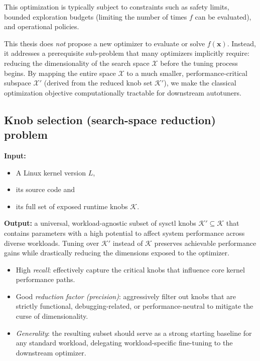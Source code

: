 This optimization is typically subject to constraints such as safety limits, bounded exploration budgets (limiting the number of times $f$ can be evaluated), and operational policies.

This thesis does \emph{not} propose a new optimizer to evaluate or solve $f(\mathbf{x})$.
Instead, it addresses a prerequisite sub-problem that many optimizers implicitly require: reducing the dimensionality of the search space $\mathcal{X}$ before the tuning process begins. By mapping the entire space $\mathcal{X}$ to a much smaller, performance-critical subspace $\mathcal{X}'$ (derived from the reduced knob set $\mathcal{K}'$), we make the classical optimization objective computationally tractable for downstream autotuners.

\subsection{Knob selection (search-space reduction) problem}\label{sec:problem-knob-selection}

\textbf{Input:}
\begin{itemize}
    \item A Linux kernel version $L$,
    \item its source code and
    \item its full set of exposed runtime knobs $\mathcal{K}$.
\end{itemize}

\textbf{Output:} a universal, workload-agnostic subset of sysctl knobs $\mathcal{K}' \subseteq \mathcal{K}$ that contains parameters with a high potential to affect system performance across diverse workloads.
Tuning over $\mathcal{K}'$ instead of $\mathcal{K}$ preserves achievable performance gains while drastically reducing the dimensions exposed to the optimizer.

\begin{itemize}
    \item High \emph{recall}: effectively capture the critical knobs that influence core kernel performance paths.
    \item Good \emph{reduction factor (precision)}: aggressively filter out knobs that are strictly functional, debugging-related, or performance-neutral to mitigate the curse of dimensionality.
    \item \emph{Generality}: the resulting subset should serve as a strong starting baseline for any standard workload, delegating workload-specific fine-tuning to the downstream optimizer.
\end{itemize}

